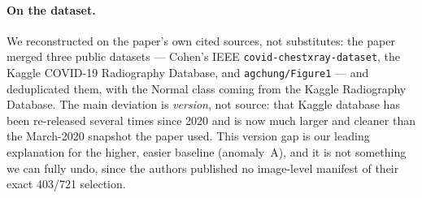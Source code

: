 \documentclass[11pt]{article}
\newcommand{\code}[1]{\texttt{#1}}
\begin{document}
\paragraph{On the dataset.} We reconstructed on the paper's own cited sources, not
substitutes: the paper merged three public datasets --- Cohen's IEEE
\code{covid-chestxray-dataset}, the Kaggle COVID-19 Radiography Database, and
\code{agchung/Figure1} --- and deduplicated them, with the Normal class coming from
the Kaggle Radiography Database. The main deviation is \emph{version}, not source:
that Kaggle database has been re-released several times since 2020 and is now much
larger and cleaner than the March-2020 snapshot the paper used. This version gap is
our leading explanation for the higher, easier baseline (anomaly~A), and it is not
something we can fully undo, since the authors published no image-level manifest of
their exact 403/721 selection.
\end{document}
